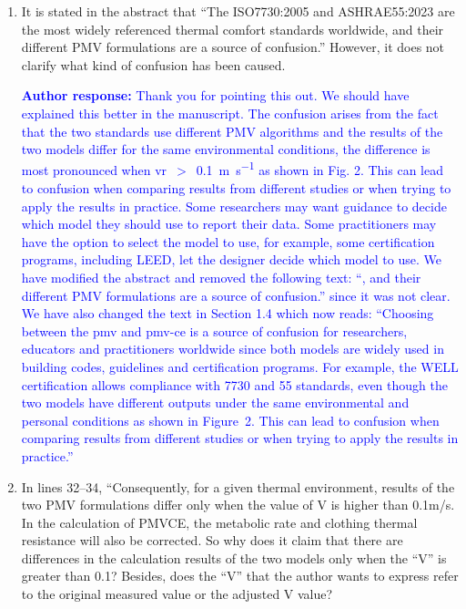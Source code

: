 \documentclass[a4paper, 10pt]{letter}
\newcommand{\response}[1]{\textcolor{blue}{\textbf{Author response:} #1}}
\begin{document}
\begin{letter}
\begin{enumerate}
            \response{We aimed to determine and compare the accuracy of the \ac{pmv} models implemented in the ISO 7730:2005 and ASHRAE 55:2023 standards. 
            We did not plan to assess the accuracy of the original Professor Fanger model. 
            As far as we know, the ISO 7730:2005 implementation is closer to the original model than the ASHRAE 55:2023.
            }

            \item It is stated in the abstract that ``The ISO7730:2005 and ASHRAE55:2023 are the most widely referenced thermal comfort standards worldwide, and their different PMV formulations are a source of confusion.''
            However, it does not clarify what kind of confusion has been caused.

            \response{Thank you for pointing this out.
            We should have explained this better in the manuscript.
            The confusion arises from the fact that the two standards use different PMV algorithms and the results of the two models differ for the same environmental conditions, the difference is most pronounced when \ac{vr}~$>$~\qty{0.1}{\m\per\s} as shown in Fig. 2.
            This can lead to confusion when comparing results from different studies or when trying to apply the results in practice. 
            Some researchers may want guidance to decide which model they should use to report their data. 
            Some practitioners may have the option to select the model to use, for example, some certification programs, including LEED, let the designer decide which model to use. 
            We have modified the abstract and removed the following text: ``, and their different PMV formulations are a source of confusion.'' since it was not clear.
            We have also changed the text in Section 1.4 which now reads: ``Choosing between the \ac{pmv} and \ac{pmv-ce} is a source of confusion for researchers, educators and practitioners worldwide since both models are widely used in building codes, guidelines and certification programs.
            For example, the WELL certification allows compliance with \gls{7730} and \gls{55} standards, even though the two models have different outputs under the same environmental and personal conditions as shown in Figure~2. This can lead to confusion when comparing results from different studies or when trying to apply the results in practice.''
            }

            \item In lines 32--34, ``Consequently, for a given thermal environment, results of the two PMV formulations differ only when the value of V is higher than 0.1m/s.
            In the calculation of PMVCE, the metabolic rate and clothing thermal resistance will also be corrected.
            So why does it claim that there are differences in the calculation results of the two models only when the ``V'' is greater than 0.1?
            Besides, does the ``V'' that the author wants to express refer to the original measured value or the adjusted V value?


\end{enumerate}
\end{letter}
\end{document}
